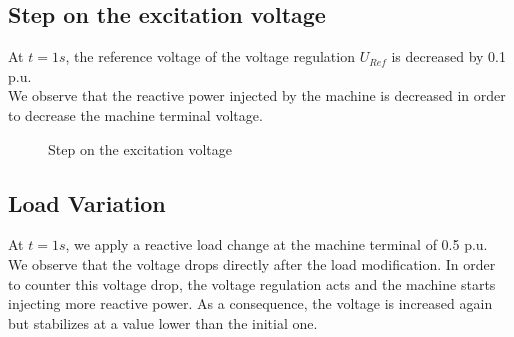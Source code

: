 \documentclass[a4paper, 12pt]{report}
\begin{document}
\newpage
\subsection{Step on the excitation voltage}

At $t=1s$, the reference voltage of the voltage regulation $U_{Ref}$ is decreased by 0.1 p.u.\\

We observe that the reactive power injected by the machine is decreased in order to decrease the machine terminal voltage.\\

\begin{figure}[H]
\caption{Step on the excitation voltage}
\end{figure}

\newpage
\subsection{Load Variation}

At $t=1s$, we apply a reactive load change at the machine terminal of 0.5 p.u.\\

We observe that the voltage drops directly after the load modification. In order to counter this voltage drop, the voltage regulation acts and the machine starts injecting more reactive power. As a consequence, the voltage is increased again but stabilizes at a value lower than the initial one. \\
\end{document}
